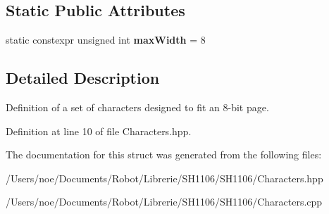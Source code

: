 \subsection*{Static Public Attributes}
\begin{DoxyCompactItemize}
\item 
\mbox{\label{struct_page_font_af13eda8abbbc85cedb046421f79a3fdf}} 
static constexpr unsigned int {\bfseries max\+Width} = 8
\end{DoxyCompactItemize}


\subsection{Detailed Description}
Definition of a set of characters designed to fit an 8-\/bit page. 

Definition at line 10 of file Characters.\+hpp.



The documentation for this struct was generated from the following files\+:\begin{DoxyCompactItemize}
\item 
/\+Users/noe/\+Documents/\+Robot/\+Librerie/\+S\+H1106/\+S\+H1106/Characters.\+hpp\item 
/\+Users/noe/\+Documents/\+Robot/\+Librerie/\+S\+H1106/\+S\+H1106/Characters.\+cpp\end{DoxyCompactItemize}
